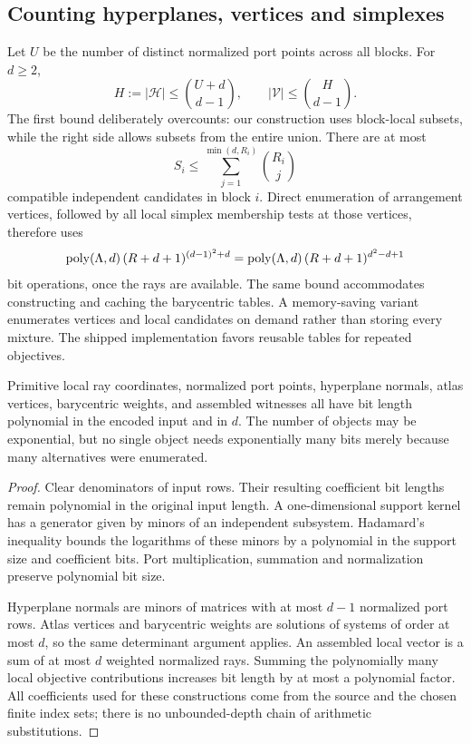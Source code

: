 \subsection{Counting hyperplanes, vertices and simplexes}
Let $U$ be the number of distinct normalized port points across all blocks. For $d\ge2$,
\begin{equation}
 H:=|\mathcal H|\le\binom{U+d}{d-1},\qquad
 |\mathcal V|\le\binom H{d-1}.
 \label{eq:counts}
\end{equation}
The first bound deliberately overcounts: our construction uses block-local subsets, while the right side allows subsets from the entire union. There are at most
\[
 S_i\le\sum_{j=1}^{\min(d,R_i)}\binom{R_i}{j}
\]
compatible independent candidates in block $i$. Direct enumeration of arrangement vertices, followed by all local simplex membership tests at those vertices, therefore uses
\begin{equation}
 \operatorname{poly}(\Lambda,d)\,(R+d+1)^{(d-1)^2+d}
 =\operatorname{poly}(\Lambda,d)\,(R+d+1)^{d^2-d+1}
 \label{eq:ray-cost}
\end{equation}
bit operations, once the rays are available. The same bound accommodates constructing and caching the barycentric tables. A memory-saving variant enumerates vertices and local candidates on demand rather than storing every mixture. The shipped implementation favors reusable tables for repeated objectives.

\begin{lemma}
\label{lem:bits}
Primitive local ray coordinates, normalized port points, hyperplane normals, atlas vertices, barycentric weights, and assembled witnesses all have bit length polynomial in the encoded input and in $d$. The number of objects may be exponential, but no single object needs exponentially many bits merely because many alternatives were enumerated.
\end{lemma}
\begin{proof}
Clear denominators of input rows. Their resulting coefficient bit lengths remain polynomial in the original input length. A one-dimensional support kernel has a generator given by minors of an independent subsystem. Hadamard's inequality bounds the logarithms of these minors by a polynomial in the support size and coefficient bits. Port multiplication, summation and normalization preserve polynomial bit size.

Hyperplane normals are minors of matrices with at most $d-1$ normalized port rows. Atlas vertices and barycentric weights are solutions of systems of order at most $d$, so the same determinant argument applies. An assembled local vector is a sum of at most $d$ weighted normalized rays. Summing the polynomially many local objective contributions increases bit length by at most a polynomial factor. All coefficients used for these constructions come from the source and the chosen finite index sets; there is no unbounded-depth chain of arithmetic substitutions.
\end{proof}

